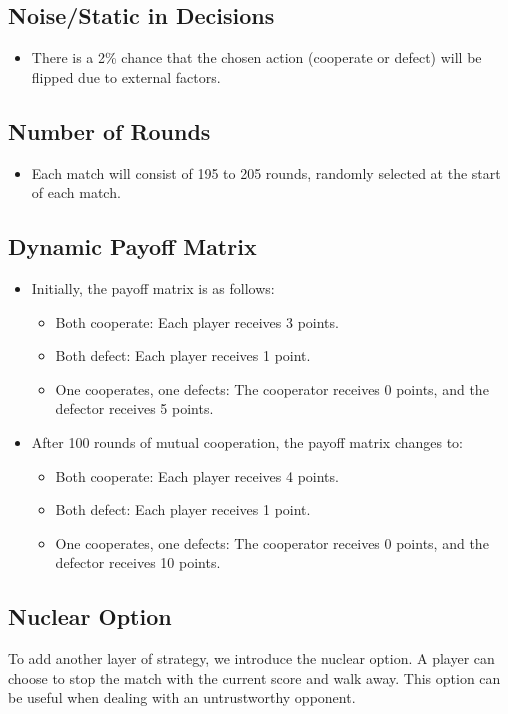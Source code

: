\documentclass[11pt]{article}
\begin{document}
\subsection*{Noise/Static in Decisions}
\begin{itemize}
    \item There is a 2\% chance that the chosen action (cooperate or defect) will be flipped due to external factors.
\end{itemize}

\subsection*{Number of Rounds}
\begin{itemize}
    \item Each match will consist of 195 to 205 rounds, randomly selected at the start of each match.
\end{itemize}

\subsection*{Dynamic Payoff Matrix}
\begin{itemize}
    \item Initially, the payoff matrix is as follows:
    \begin{itemize}
        \item Both cooperate: Each player receives 3 points.
        \item Both defect: Each player receives 1 point.
        \item One cooperates, one defects: The cooperator receives 0 points, and the defector receives 5 points.
    \end{itemize}
    \item After 100 rounds of mutual cooperation, the payoff matrix changes to:
    \begin{itemize}
        \item Both cooperate: Each player receives 4 points.
        \item Both defect: Each player receives 1 point.
        \item One cooperates, one defects: The cooperator receives 0 points, and the defector receives 10 points.
    \end{itemize}
\end{itemize}

\subsection*{Nuclear Option}
To add another layer of strategy, we introduce the nuclear option. A player can choose to stop the match with the current score and walk away. This option can be useful when dealing with an untrustworthy opponent. 
\end{document}
